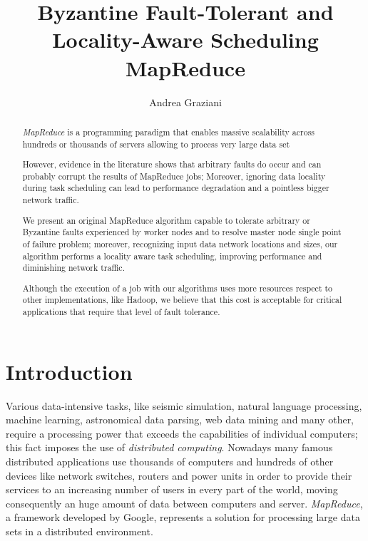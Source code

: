 \documentclass[sigchi]{acmart}
\begin{document}
\title{Byzantine Fault-Tolerant and Locality-Aware Scheduling MapReduce}

\author{Andrea Graziani}

\renewcommand{\shortauthors}{Andrea Graziani (0273395)}

\begin{abstract}
\textit{MapReduce} is a programming paradigm that enables massive scalability across hundreds or thousands of servers allowing to process very large data set \cite{IBMWhatIsMapReduce}

However, evidence in the literature shows that arbitrary faults do occur and can probably corrupt the results of MapReduce jobs\cite{MicrosoftStudyFailure}; Moreover, ignoring data locality during task scheduling can lead to performance degradation and a pointless bigger network traffic.

We present an original MapReduce algorithm capable to tolerate arbitrary or Byzantine faults experienced by worker nodes and to resolve master node single point of failure problem; moreover, recognizing input data network locations and sizes, our algorithm performs a locality aware task scheduling, improving performance and diminishing network traffic.

Although the execution of a job with our algorithms uses more resources respect to other implementations, like Hadoop, we believe that this cost is acceptable for critical applications that require that level of fault tolerance.
\end{abstract}

\maketitle

\section{Introduction}

Various data-intensive tasks, like seismic simulation, natural language processing, machine learning, astronomical data parsing, web data mining and many other, require a processing power that exceeds the capabilities of individual computers; this fact imposes the use of \textit{distributed computing}. Nowadays many famous distributed applications use thousands of computers and hundreds of other devices like network switches, routers and power units in order to provide their services to an increasing number of users in every part of the world, moving consequently an huge amount of data between computers and server. \textit{MapReduce}, a framework developed by Google, represents a solution for processing large data sets in a distributed environment. 
\end{document}
